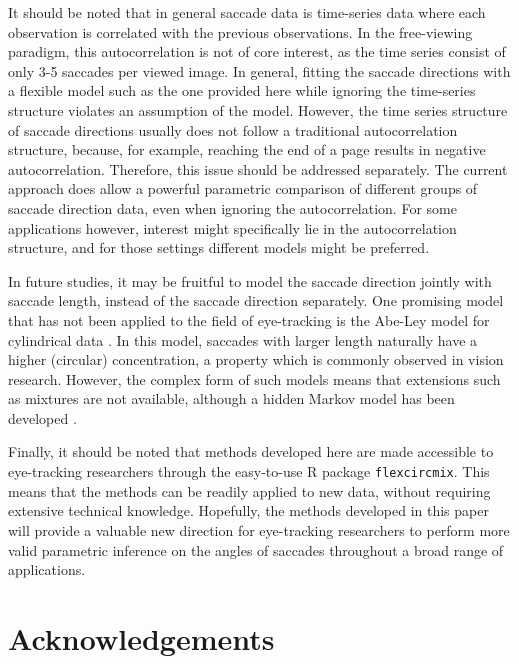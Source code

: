 It should be noted that in general saccade data is time-series data where each observation is correlated with the previous observations. In the free-viewing paradigm, this autocorrelation is not of core interest, as the time series consist of only 3-5 saccades per viewed image. In general, fitting the saccade directions with a flexible model such as the one provided here while ignoring the time-series structure violates an assumption of the model. However, the time series structure of saccade directions usually does not follow a traditional autocorrelation structure, because, for example, reaching the end of a page results in negative autocorrelation. Therefore, this issue should be addressed separately. The current approach does allow a powerful parametric comparison of different groups of saccade direction data, even when ignoring the autocorrelation. For some applications however, interest might specifically lie in the autocorrelation structure, and for those settings different models might be preferred.

In future studies, it may be fruitful to model the saccade direction jointly with saccade length, instead of the saccade direction separately. One promising model that has not been applied to the field of eye-tracking is the Abe-Ley model for cylindrical data \citep{abe2016tractable}. In this model, saccades with larger length naturally have a higher (circular) concentration, a property which is commonly observed in vision research. However, the complex form of such models means that extensions such as mixtures are not available, although a hidden Markov model has been developed \citep{lagona2015hidden}.

Finally, it should be noted that methods developed here are made accessible to eye-tracking researchers through the easy-to-use R package \texttt{flexcircmix}. This means that the methods can be readily applied to new data, without requiring extensive technical knowledge. Hopefully, the methods developed in this paper will provide a valuable new direction for eye-tracking researchers to perform more valid parametric inference on the angles of saccades throughout a broad range of applications.



\section{Acknowledgements}





\newpage

